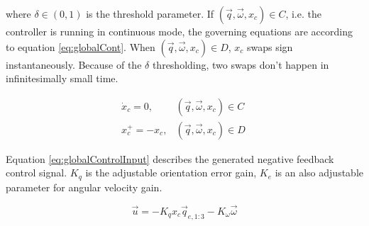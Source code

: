 where $\delta \in (0,1)$ is the threshold parameter. If $(\vec{q},\vec{\omega},x_c) \in C$, i.e. the controller is running in continuous mode, the governing equations are according to equation \ref{eq:globalCont}. When $(\vec{q},\vec{\omega},x_c) \in D$, $x_c$ swaps sign instantaneously. Because of the $\delta$ thresholding, two swaps don't happen in infinitesimally small time.  

\begin{align}
	\label{eq:globalCont}
\dot{x}_c = 0, & (\vec{q},\vec{\omega},x_c)  \in C \\
\label{eq:globalDiscont}
x_c^+ = -x_c, & (\vec{q},\vec{\omega},x_c) \in D\
\end{align}

Equation \ref{eq:globalControlInput} describes the generated negative feedback control signal. $K_q$ is the adjustable orientation error gain, $K_e$ is an also adjustable parameter for angular velocity gain.

\begin{equation}
\label{eq:globalControlInput}
\vec{u} = -K_q x_c \vec{q}_{e, 1:3} -K_\omega \vec{\omega}
\end{equation}




